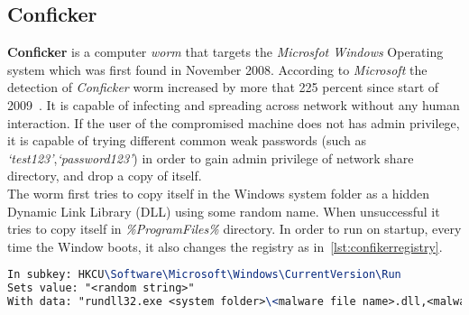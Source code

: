 \subsection{Conficker}
\label{sub:Conficker}
\textbf{Conficker} is a computer \emph{worm} that targets the \emph{Microsfot Windows} Operating system which was first found in November 2008.
According to \emph{Microsoft} the detection of \emph{Conficker} worm increased by more that 225 percent since start of 2009~\cite[]{conficker}.
It is capable of infecting and spreading across network without any human interaction.
If the user of the compromised machine does not has admin privilege, it is capable of trying different common weak passwords (such as \emph{`test123'},\emph{`password123'}) in order to gain admin privilege of network share directory, and drop a copy of itself.\\
The worm first tries to copy itself in the Windows system folder as a hidden Dynamic Link Library (DLL) using some random name. When unsuccessful it tries to copy itself in \emph{\%ProgramFiles\%} directory.
In order to run on startup, every time the Window boots, it also changes the registry as in~\autoref{lst:confikerregistry}.
\begin{lstlisting}[language=TeX,caption={Registry key created by Confiker worm for autostart},label={lst:confikerregistry}]
In subkey: HKCU\Software\Microsoft\Windows\CurrentVersion\Run
Sets value: "<random string>"
With data: "rundll32.exe <system folder>\<malware file name>.dll,<malware parameters>"
\end{lstlisting}
